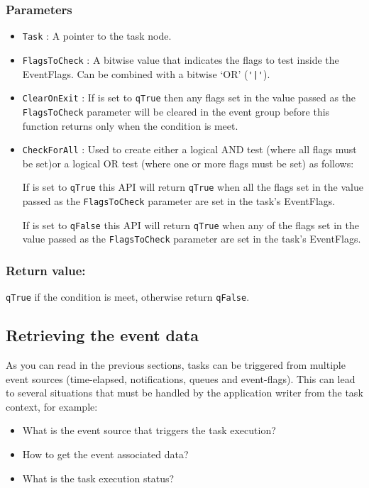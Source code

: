 \subsubsection*{Parameters}
\begin{itemize}
    \item \lstinline{Task} : A pointer to the task node.
    \item \lstinline{FlagsToCheck} : A bitwise value that indicates the flags to test inside the EventFlags. Can be combined with a bitwise ‘OR’ (\lstinline{'|'}).
    \item \lstinline{ClearOnExit} : If is set to \lstinline{qTrue} then any flags set in the value passed as the \lstinline{FlagsToCheck} parameter will be cleared in the event group before this function returns only when the condition is meet.
    \item \lstinline{CheckForAll} : Used to create either a logical AND test (where all flags must be set)or a logical OR test (where one or more flags must be set) as follows:
    
    If is set to \lstinline{qTrue} this API will return \lstinline{qTrue} when all the flags set in the value passed as the \lstinline{FlagsToCheck} parameter are set in the task's EventFlags.
    
    If is set to \lstinline{qFalse} this API will return \lstinline{qTrue} when any of the flags set in the value passed as the \lstinline{FlagsToCheck} parameter are set in the task's EventFlags.

\end{itemize}

\subsubsection*{Return value:}

\lstinline{qTrue} if the condition is meet, otherwise return \lstinline{qFalse}.


\subsection{Retrieving the event data} \label{eventdata} 
As you can read in the previous sections, tasks can be triggered from multiple event sources (time-elapsed, notifications, queues and event-flags). This can lead to several situations that must be handled by the application writer from the task context, for example:

\begin{itemize}
    \item What is the event source that triggers the task execution?
    \item How to get the event associated data?
    \item What is the task execution status? 
\end{itemize}

